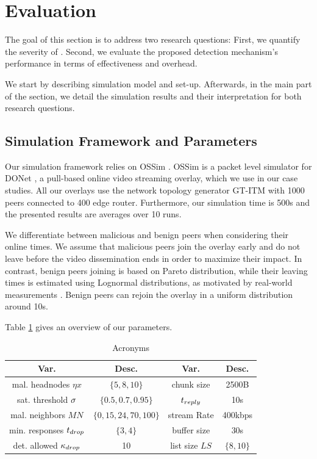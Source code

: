 \section{Evaluation}
\label{sec:eval}

The goal of this section is to address two research questions: 
First, we quantify the severity of \drop. 
Second, we evaluate the proposed detection mechanism's performance in terms of effectiveness and overhead. 

We start by describing simulation model and set-up. 
Afterwards, in the main part of the section, we detail the simulation results and their interpretation for both research questions.

\subsection{Simulation Framework and Parameters}
Our simulation framework relies on OSSim \cite{nguyen2013ossim}. 
OSSim is a packet level simulator for DONet \cite{zhang2005coolstreaming}, a pull-based online video streaming overlay, which we use in our case studies.
All our overlays use the network topology generator GT-ITM \cite{GT} with 1000 peers connected to 400 edge router. Furthermore, our simulation time is 500s and the presented results are averages over 10 runs. 

We differentiate between malicious and benign peers when considering their online times. 
We assume that malicious peers join the overlay early and do not leave before the video dissemination ends in order to maximize their impact. 
In contrast,  benign peers joining is based on Pareto distribution, while their leaving times is estimated using Lognormal distributions, as motivated by real-world measurements \cite{distribution}.
Benign peers can rejoin the overlay in a uniform distribution around 10s.


Table \ref{tab:parameters} gives an overview of our parameters. 

\begin{table}[ht]
\center
\caption{Acronyms}
\begin{tabular}{|c|c||c|c|}
\hline

\bf{Var.} & \bf{Desc.}  & \bf{Var.} & \bf{Desc.} \\\hline\hline

mal. headnodes $\eta x$ & $\{5,8,10\}$ & chunk size & 2500B \\\hline
sat. threshold $\sigma$ & $\{0.5,0.7,0.95\}$ & $t_{reply}$ & 10s\\\hline
mal. neighbors $MN$  & $\{0,15,24,70,100\}$ & stream Rate & 400kbps\\\hline
min. responses $t_{drop}$ &  $\{3,4\}$ & buffer size & 30s  \\\hline
det. allowed $\kappa_{drop}$ & 10 & list size $LS$ & $\{8,10\}$\\\hline
  
\end{tabular}
\label{tab:parameters}
\end{table}


